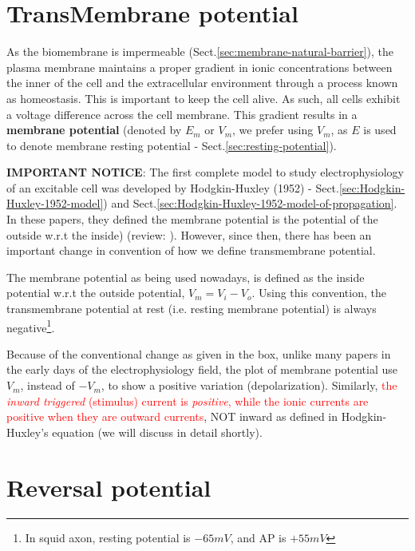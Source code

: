 \section{TransMembrane potential}
\label{sec:membrane-potential}

As the biomembrane is impermeable (Sect.\ref{sec:membrane-natural-barrier}), the
plasma membrane maintains a proper gradient in ionic concentrations between the
inner of the cell and the extracellular environment through a process known as
homeostasis.
This is important to keep the cell alive. As such, all cells exhibit a voltage
difference across the cell membrane. This gradient results in a {\bf membrane
potential} (denoted by $E_m$ or $V_m$, we prefer using $V_m$, as $E$ is used to
denote membrane resting potential - Sect.\ref{sec:resting-potential}).

\begin{mdframed}

{\bf IMPORTANT NOTICE}: The first complete model to study electrophysiology of
an excitable cell was developed by Hodgkin-Huxley (1952) -
Sect.\ref{sec:Hodgkin-Huxley-1952-model}) and
Sect.\ref{sec:Hodgkin-Huxley-1952-model-of-propagation}.
In these papers, they defined the membrane potential is the potential of the
outside w.r.t the inside) \citep{hodgkin1952ap} (review: \citep{nelson2004}).
However, since then, there has been an important change in convention of how we
define transmembrane potential. 

The membrane potential as being used nowadays, is defined as the inside
potential w.r.t the outside potential, $V_m=V_i-V_o$. Using this convention, the
transmembrane potential at rest (i.e. resting membrane potential) is always
negative\footnote{In squid axon, resting potential is $-65mV$, and AP is
$+55mV$}. 
\end{mdframed}

Because of the conventional change as given in the box, unlike many papers in
the early days of the electrophysiology field, the plot of membrane potential
use $V_m$, instead of $-V_m$, to show a positive variation (depolarization).
Similarly, \textcolor{red}{the {\it inward triggered} (stimulus) current is {\it
positive}, while the ionic currents are positive when they are outward 
currents}, NOT inward as defined in Hodgkin-Huxley's equation (we will discuss
in detail shortly).




\section{Reversal potential}
\label{sec:reversal-potential}

